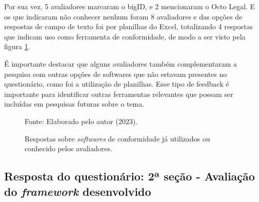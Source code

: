 \documentclass[
	12pt,				%
	openright,			%
	oneside,			%
	a4paper,			%
	english,			%
	french,				%
	spanish,			%
	brazil,				%
	]{abntex2}
\begin{document}
Por sua vez, 5 avaliadores marcaram o bigID, e 2 mencionaram o Octo Legal. E os que indicaram não conhecer nenhum foram 8 avaliadores e das opções de respostas de campo de texto foi por planilhas do Excel, totalizando 4 respostas que indicam uso como ferramenta de conformidade, de modo a ser visto pela figura \ref{fig: grafico6}.

É importante destacar que alguns avaliadores também complementaram a pesquisa com outras opções de softwares que não estavam presentes no questionário, como foi a utilização de planilhas. Esse tipo de feedback é importante para identificar outras ferramentas relevantes que possam ser incluídas em pesquisas futuras sobre o tema. 

\begin{figure}[ht]
    \centering
    \caption{Respostas sobre \textit{softwares} de conformidade já utilizados ou conhecido pelos avaliadores.}
    \label{fig: grafico6}
    
    \centering \small Fonte: Elaborado pelo autor (2023).
\end{figure}




 \subsection{Resposta do questionário: 2ª seção - Avaliação do \textit{framework} desenvolvido}
\end{document}
